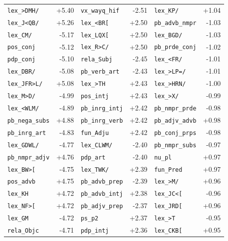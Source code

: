 \begin{longtable}{lrlrlr}
\texttt{lex\_\textgreater{}DMH/} & +5.40 & \texttt{vx\_wayq\_hif} & -2.51 & \texttt{lex\_KP/} & +1.04 \\
\texttt{lex\_J\textless{}QB/} & +5.26 & \texttt{lex\_\textless{}BR[} & +2.50 & \texttt{pb\_advb\_nmpr} & -1.03 \\
\texttt{lex\_CM/} & -5.17 & \texttt{lex\_LQX[} & +2.50 & \texttt{lex\_BGD/} & -1.03 \\
\texttt{pos\_conj} & -5.12 & \texttt{lex\_R\textgreater{}C/} & +2.50 & \texttt{pb\_prde\_conj} & -1.02 \\
\texttt{pdp\_conj} & -5.10 & \texttt{rela\_Subj} & -2.45 & \texttt{lex\_\textless{}FR/} & -1.01 \\
\texttt{lex\_DBR/} & -5.08 & \texttt{pb\_verb\_art} & -2.43 & \texttt{lex\_\textgreater{}LP=/} & -1.01 \\
\texttt{lex\_JFR\textgreater{}L/} & +5.08 & \texttt{lex\_\textgreater{}TH} & +2.43 & \texttt{lex\_\textgreater{}HRN/} & -1.00 \\
\texttt{lex\_M\textgreater{}D/} & -4.99 & \texttt{pos\_intj} & +2.43 & \texttt{lex\_\textgreater{}X/} & -0.99 \\
\texttt{lex\_\textless{}WLM/} & -4.89 & \texttt{pb\_inrg\_intj} & +2.42 & \texttt{pb\_nmpr\_prde} & -0.98 \\
\texttt{pb\_nega\_subs} & +4.88 & \texttt{pb\_inrg\_verb} & +2.42 & \texttt{pb\_adjv\_advb} & +0.98 \\
\texttt{pb\_inrg\_art} & -4.83 & \texttt{fun\_Adju} & +2.42 & \texttt{pb\_conj\_prps} & -0.98 \\
\texttt{lex\_GDWL/} & -4.77 & \texttt{lex\_CLWM/} & -2.40 & \texttt{pb\_nmpr\_subs} & -0.97 \\
\texttt{pb\_nmpr\_adjv} & +4.76 & \texttt{pdp\_art} & -2.40 & \texttt{nu\_pl} & +0.97 \\
\texttt{lex\_BW\textgreater{}[} & -4.75 & \texttt{lex\_TWK/} & +2.39 & \texttt{fun\_Pred} & +0.97 \\
\texttt{pos\_advb} & +4.75 & \texttt{pb\_advb\_prep} & -2.39 & \texttt{lex\_\textgreater{}M/} & +0.96 \\
\texttt{lex\_KH} & +4.72 & \texttt{pb\_advb\_intj} & +2.38 & \texttt{lex\_JC\textless{}[} & -0.96 \\
\texttt{lex\_NF\textgreater{}[} & +4.72 & \texttt{pb\_adjv\_prep} & -2.37 & \texttt{lex\_JRD[} & +0.96 \\
\texttt{lex\_GM} & -4.72 & \texttt{ps\_p2} & +2.37 & \texttt{lex\_\textgreater{}T} & -0.95 \\
\texttt{rela\_Objc} & -4.71 & \texttt{pdp\_intj} & +2.36 & \texttt{lex\_CKB[} & +0.95 \\

\end{longtable}
